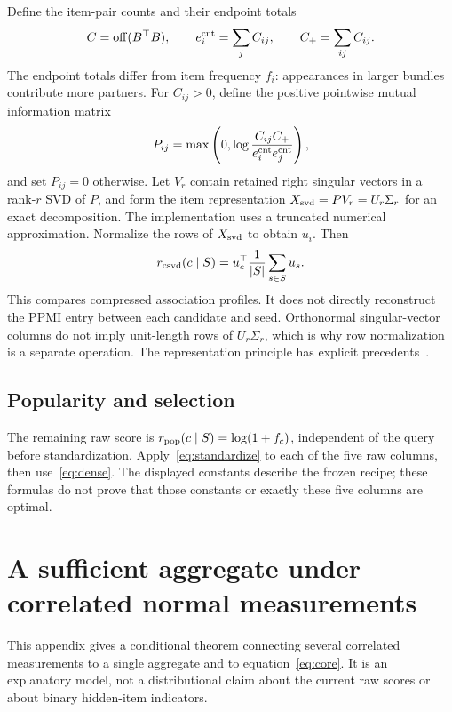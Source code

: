 \documentclass[11pt,a4paper]{article}
\newcommand{\off}{\operatorname{off}}
\begin{document}
Define the item-pair counts and their endpoint totals
\begin{equation}
 C=\off(B^\top B),\qquad e_i^{\rm cnt}=\sum_j C_{ij},\qquad
 C_+=\sum_{ij}C_{ij}.
\end{equation}
The endpoint totals differ from item frequency $f_i$: appearances in larger
bundles contribute more partners. For $C_{ij}>0$, define the positive
pointwise mutual information matrix
\begin{equation}
 P_{ij}=\max\left(0,\log\frac{C_{ij}C_+}
                                  {e_i^{\rm cnt}e_j^{\rm cnt}}\right),
\end{equation}
and set $P_{ij}=0$ otherwise. Let $V_r$ contain retained right singular
vectors in a rank-$r$ SVD of $P$, and form the item representation
$X_{\rm svd}=PV_r=U_r\Sigma_r$ for an exact decomposition. The
implementation uses a truncated numerical approximation. Normalize the
rows of $X_{\rm svd}$ to obtain $u_i$. Then
\begin{equation}
 r_{\rm csvd}(c\mid S)=u_c^\top\frac1{|S|}\sum_{s\in S}u_s.
\end{equation}
This compares compressed association profiles. It does not directly
reconstruct the PPMI entry between each candidate and seed. Orthonormal
singular-vector columns do not imply unit-length rows of $U_r\Sigma_r$,
which is why row normalization is a separate operation. The representation
principle has explicit precedents~\cite{levy2015,afchar2023}.

\subsection{Popularity and selection}

The remaining raw score is $r_{\rm pop}(c\mid S)=\log(1+f_c)$, independent
of the query before standardization. Apply~\eqref{eq:standardize} to each
of the five raw columns, then use~\eqref{eq:dense}.
The displayed constants describe the frozen recipe; these formulas do not
prove that those constants or exactly these five columns are optimal.

\section{A sufficient aggregate under correlated normal measurements}
\label{app:normal}

This appendix gives a conditional theorem connecting several correlated
measurements to a single aggregate and to equation~\eqref{eq:core}. It is
an explanatory model, not a distributional claim about the current raw
scores or about binary hidden-item indicators.
\end{document}
